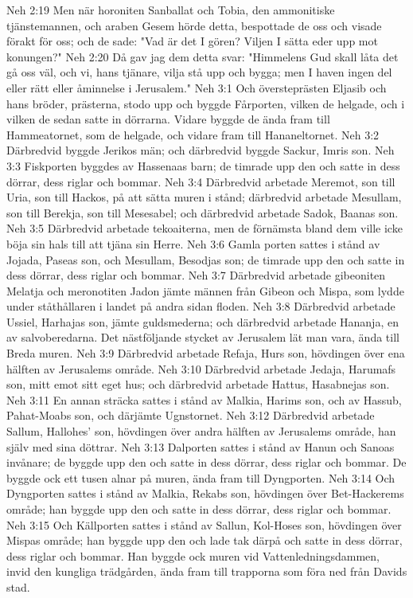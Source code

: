 Neh 2:19  Men när horoniten Sanballat och Tobia, den ammonitiske tjänstemannen, och araben Gesem hörde detta, bespottade de oss och visade förakt för oss; och de sade: "Vad är det I gören? Viljen I sätta eder upp mot konungen?"
Neh 2:20  Då gav jag dem detta svar: "Himmelens Gud skall låta det gå oss väl, och vi, hans tjänare, vilja stå upp och bygga; men I haven ingen del eller rätt eller åminnelse i Jerusalem."
Neh 3:1  Och översteprästen Eljasib och hans bröder, prästerna, stodo upp och byggde Fårporten, vilken de helgade, och i vilken de sedan satte in dörrarna. Vidare byggde de ända fram till Hammeatornet, som de helgade, och vidare fram till Hananeltornet.
Neh 3:2  Därbredvid byggde Jerikos män; och därbredvid byggde Sackur, Imris son.
Neh 3:3  Fiskporten byggdes av Hassenaas barn; de timrade upp den och satte in dess dörrar, dess riglar och bommar.
Neh 3:4  Därbredvid arbetade Meremot, son till Uria, son till Hackos, på att sätta muren i stånd; därbredvid arbetade Mesullam, son till Berekja, son till Mesesabel; och därbredvid arbetade Sadok, Baanas son.
Neh 3:5  Därbredvid arbetade tekoaiterna, men de förnämsta bland dem ville icke böja sin hals till att tjäna sin Herre.
Neh 3:6  Gamla porten sattes i stånd av Jojada, Paseas son, och Mesullam, Besodjas son; de timrade upp den och satte in dess dörrar, dess riglar och bommar.
Neh 3:7  Därbredvid arbetade gibeoniten Melatja och meronotiten Jadon jämte männen från Gibeon och Mispa, som lydde under ståthållaren i landet på andra sidan floden.
Neh 3:8  Därbredvid arbetade Ussiel, Harhajas son, jämte guldsmederna; och därbredvid arbetade Hananja, en av salvoberedarna. Det nästföljande stycket av Jerusalem lät man vara, ända till Breda muren.
Neh 3:9  Därbredvid arbetade Refaja, Hurs son, hövdingen över ena hälften av Jerusalems område.
Neh 3:10  Därbredvid arbetade Jedaja, Harumafs son, mitt emot sitt eget hus; och därbredvid arbetade Hattus, Hasabnejas son.
Neh 3:11  En annan sträcka sattes i stånd av Malkia, Harims son, och av Hassub, Pahat-Moabs son, och därjämte Ugnstornet.
Neh 3:12  Därbredvid arbetade Sallum, Hallohes' son, hövdingen över andra hälften av Jerusalems område, han själv med sina döttrar.
Neh 3:13  Dalporten sattes i stånd av Hanun och Sanoas invånare; de byggde upp den och satte in dess dörrar, dess riglar och bommar. De byggde ock ett tusen alnar på muren, ända fram till Dyngporten.
Neh 3:14  Och Dyngporten sattes i stånd av Malkia, Rekabs son, hövdingen över Bet-Hackerems område; han byggde upp den och satte in dess dörrar, dess riglar och bommar.
Neh 3:15  Och Källporten sattes i stånd av Sallun, Kol-Hoses son, hövdingen över Mispas område; han byggde upp den och lade tak därpå och satte in dess dörrar, dess riglar och bommar. Han byggde ock muren vid Vattenledningsdammen, invid den kungliga trädgården, ända fram till trapporna som föra ned från Davids stad.
